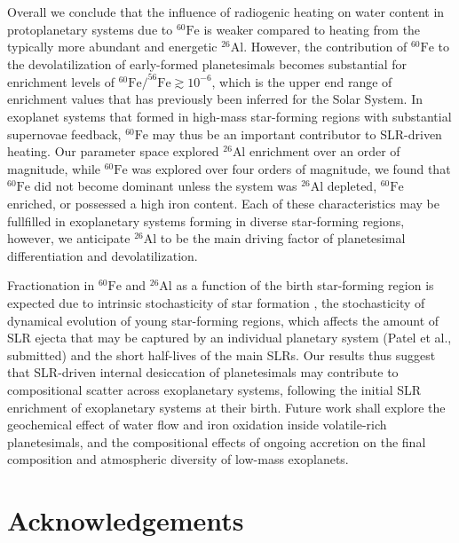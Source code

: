 \documentclass[fleqn,usenatbib]{mnras}
\newcommand{\atom}[2]{$^{#2}\text{#1}$}
\newcommand{\al}{\atom{Al}{26}}
\newcommand{\fe}{\atom{Fe}{60}}
\begin{document}
Overall we conclude that the influence of radiogenic heating on water content in protoplanetary systems due to \fe{} is weaker compared to heating from the typically more abundant and energetic \al{}.
However, the contribution of \fe{} to the devolatilization of early-formed planetesimals becomes substantial for enrichment levels of $^{60}\mathrm{Fe}/^{56}\mathrm{Fe} \gtrsim 10^{-6}$, which is the upper end range of enrichment values that has previously been inferred for the Solar System.
In exoplanet systems that formed in high-mass star-forming regions with substantial supernovae feedback, \fe{} may thus be an important contributor to SLR-driven heating.
Our parameter space explored \al{} enrichment over an order of magnitude, while \fe{} was explored over four orders of magnitude, we found that \fe{} did not become dominant unless the system was \al{} depleted, \fe{} enriched, or possessed a high iron content. Each of these characteristics may be fullfilled in exoplanetary systems forming in diverse star-forming regions, however, we anticipate \al{} to be the main driving factor of planetesimal differentiation and devolatilization. 

Fractionation in \fe{} and \al{} as a function of the birth star-forming region is expected due to intrinsic stochasticity of star formation \citep[where variations in the IMF lead to significantly different numbers of massive stars, and therefore enrichment, e.g.][]{2017MNRAS.464.4318N}, the stochasticity of dynamical evolution of young star-forming regions, which affects the amount of SLR ejecta that may be captured by an individual planetary system (Patel et al., submitted) and the short half-lives of the main SLRs. Our results thus suggest that SLR-driven internal desiccation of planetesimals may contribute to compositional scatter across exoplanetary systems, following the initial SLR enrichment of exoplanetary systems at their birth. Future work shall explore the geochemical effect of water flow and iron oxidation inside volatile-rich planetesimals, and the compositional effects of ongoing accretion on the final composition and atmospheric diversity of low-mass exoplanets.

% 


\section*{Acknowledgements}
\end{document}
